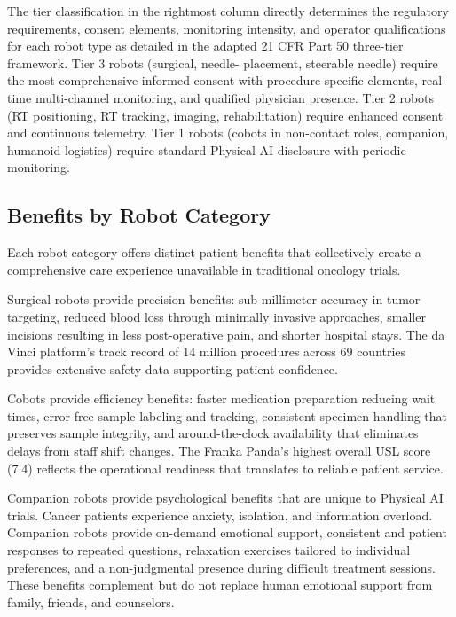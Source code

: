 The tier classification in the rightmost column directly determines the
regulatory requirements, consent elements, monitoring intensity, and operator
qualifications for each robot type as detailed in the adapted 21 CFR Part 50
\cite{cfr50-adapt} three-tier framework. Tier 3 robots (surgical, needle-
placement, steerable needle) require the most comprehensive informed consent
with procedure-specific elements, real-time multi-channel monitoring, and
qualified physician presence. Tier 2 robots (RT positioning, RT tracking,
imaging, rehabilitation) require enhanced consent and continuous telemetry.
Tier 1 robots (cobots in non-contact roles, companion, humanoid logistics)
require standard Physical AI disclosure with periodic monitoring.

\subsection{Benefits by Robot Category}
\label{subsec:instructions-category-benefits}

Each robot category offers distinct patient benefits that collectively create
a comprehensive care experience unavailable in traditional oncology trials.

Surgical robots provide precision benefits: sub-millimeter accuracy in tumor
targeting, reduced blood loss through minimally invasive approaches, smaller
incisions resulting in less post-operative pain, and shorter hospital stays.
The da Vinci platform's track record of 14 million procedures across 69
countries \cite{usl-standard} provides extensive safety data supporting
patient confidence.

Cobots provide efficiency benefits: faster medication preparation reducing
wait times, error-free sample labeling and tracking, consistent specimen
handling that preserves sample integrity, and around-the-clock availability
that eliminates delays from staff shift changes. The Franka Panda's highest
overall USL score (7.4) reflects the operational readiness that translates to
reliable patient service.

Companion robots provide psychological benefits that are unique to Physical AI
trials. Cancer patients experience anxiety, isolation, and information
overload. Companion robots provide on-demand emotional support, consistent and
patient responses to repeated questions, relaxation exercises tailored to
individual preferences, and a non-judgmental presence during difficult
treatment sessions. These benefits complement but do not replace human
emotional support from family, friends, and counselors.

